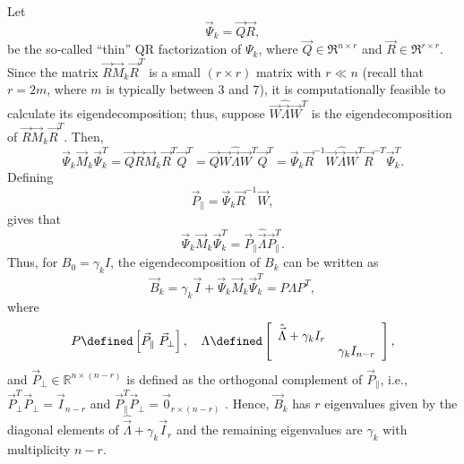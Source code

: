 {Let
\begin{equation*}
	\vec{\Psi}_k = \vec{Q}\vec{R}, 
\end{equation*}
be the so-called ``thin'' {\small QR} factorization of $\Psi_k$, where
$\vec{Q} \in \Re^{n\times r} $ and $ \vec{R} \in \Re^{r\times
  r} $.  Since the matrix $ \vec{R} \vec{M}_k \vec{R}^T$  is a small $(r\times r)$
  matrix with $r\ll n$ (recall that $r=2m$, where $m$ is typically between 3 and 7), it is
computationally feasible to calculate its eigendecomposition; thus, suppose
$\vec{W} \hat{\vec{\Lambda}} \vec{W}^T $ is the eigendecomposition of $
\vec{R} \vec{M}_k \vec{R}^T.$ Then,
\begin{equation*}
	\vec{\Psi}_k\vec{M}_k\vec{\Psi}^T_k = \vec{Q} \vec{R} \vec{M}_k\vec{R}^T \vec{Q}^T= \vec{Q} \vec{W} \hat{\vec{\Lambda}}\vec{W}^T \vec{Q}^T = 
									\vec{\Psi}_k \vec{R}^{-1} \vec{W} \hat{\vec{\Lambda}}\vec{W}^T  \vec{R}^{-T} \vec{\Psi}^{T}_k.
\end{equation*}
Defining
\begin{equation}\label{eqn-pparallel}
\vec{P}_{\parallel} = \vec{\Psi}_k \vec{R}^{-1} \vec{W},
\end{equation}
gives that
\begin{equation}\label{eqn-lambdahat}
	\vec{\Psi}_k \vec{M}_k \vec{\Psi}^T_k = \vec{P}_\parallel \hat{\vec{\Lambda}} \vec{P}^T_\parallel.
\end{equation}
Thus, for $B_0=\gamma_kI$, the eigendecomposition of $B_k$ can be written as
\begin{equation}
	\label{eq:eiglbfgs}
	\vec{B}_k = \gamma_k \vec{I} + \vec{\Psi}_k \vec{M}_k \vec{\Psi}^T_k = P\Lambda P^T,
\end{equation}
where 
\begin{equation} \label{eqn-P}
  P \defined
  \left[ \vec{P}_{\parallel} \,\, \vec{P}_{\perp}\right], \quad
  \Lambda \defined
\left[ \begin{array}{cc}
    \hat{\vec{\Lambda}}+\gamma_k I_r 	& 			\\
    & \gamma_k I_{n-r}
  \end{array}
\right],
\end{equation}
and $ \vec{P}_{\perp} \in
\mathbb{R}^{n \times (n-r)} $ is defined as the orthogonal complement of $
\vec{P}_{\parallel} $, i.e., $ \vec{P}^T_{\perp}\vec{P}_{\perp} =
\vec{I}_{n-r} $ and $ \vec{P}^T_{\parallel}\vec{P}_{\perp} = \vec{0}_{r
  \times (n-r)}$ .  
Hence, $\vec{B}_k$ has $r$ eigenvalues given by the diagonal
elements of $ \hat{ \vec{\Lambda} } +\gamma_k \vec{I}_{r} $ and
the remaining eigenvalues are $ \gamma_k $ with multiplicity $ n-r $.

}
